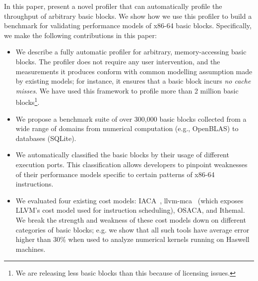 In this paper, present a novel profiler that can automatically
profile the throughput of arbitrary basic blocks.
We show how we use this profiler to build a benchmark for validating
performance models of x86-64 basic blocks.
Specifically, we make the following contributions in this paper:
\begin{itemize}
    \item We describe a fully automatic profiler
    for arbitrary, memory-accessing basic blocks.
    The profiler does not require any user intervention, 
    and the measurements it produces conform with common
    modelling assumption made by existing models;
    for instance, it ensures that a basic block incurs
    \textit{no cache misses}.
    We have used this framework to profile more than 2 million basic blocks\footnote{
    We are releasing less basic blocks than this because of licensing issues.
    }.
    
    \item We propose a benchmark suite of over 300,000 basic blocks collected from a wide range of domains from numerical computation (e.g., OpenBLAS) to databases (SQLite).
    
    \item We automatically classified the basic blocks
    by their usage of different execution ports.
    This classification allows developers to pinpoint weaknesses
    of their performance models specific to certain patterns of x86-64 instructions.
    
    \item We evaluated four existing cost models:
    IACA~\cite{iaca}, llvm-mca~\cite{llvm-mca} (which exposes LLVM’s cost model used for instruction scheduling),
    OSACA\cite{osaca}, and Ithemal\cite{ithemal}.
    We break the strength and weakness of these cost models down on
    different categories of basic blocks;
    e.g. we show that all such tools
    have average error higher than 30\% 
    when used to analyze numerical kernels running on Haswell machines.

\end{itemize}

